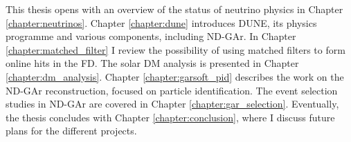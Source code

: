 This thesis opens with an overview of the status of neutrino physics in Chapter \ref{chapter:neutrinos}. Chapter \ref{chapter:dune} introduces DUNE, its physics programme and various components, including ND-GAr. In Chapter \ref{chapter:matched_filter} I review the possibility of using matched filters to form online hits in the FD. The solar DM analysis is presented in Chapter \ref{chapter:dm_analysis}. Chapter \ref{chapter:garsoft_pid} describes the work on the ND-GAr reconstruction, focused on particle identification. The event selection studies in ND-GAr are covered in Chapter \ref{chapter:gar_selection}. Eventually, the thesis concludes with Chapter \ref{chapter:conclusion}, where I discuss future plans for the different projects.